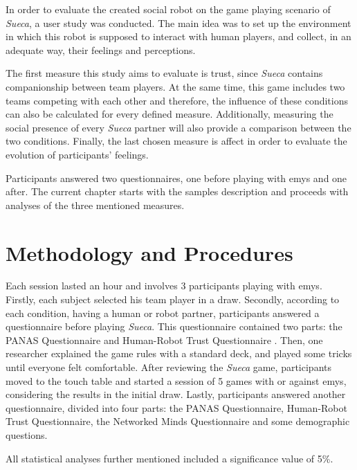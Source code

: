 \label{chapter:results}

In order to evaluate the created social robot on the game playing scenario of \emph{Sueca}, a user study was conducted.
The main idea was to set up the environment in which this robot is supposed to interact with human players, and collect, in an adequate way, their feelings and perceptions.

The first measure this study aims to evaluate is trust, since \emph{Sueca} contains companionship between team players.
At the same time, this game includes two teams competing with each other and therefore, the influence of these conditions can also be calculated for every defined measure.
Additionally, measuring the social presence of every \emph{Sueca} partner will also provide a comparison between the two conditions.
Finally, the last chosen measure is affect in order to evaluate the evolution of participants' feelings.

Participants answered two questionnaires, one before playing with \ac{emys} and one after.
The current chapter starts with the samples description and proceeds with analyses of the three mentioned measures.

\section{Methodology and Procedures}
Each session lasted an hour and involves 3 participants playing with \ac{emys}.
Firstly, each subject selected his team player in a draw.
Secondly, according to each condition, having a human or robot partner, participants answered a questionnaire before playing \emph{Sueca}.
This questionnaire contained two parts: the PANAS Questionnaire \cite{Egloff1998} and Human-Robot Trust Questionnaire \cite{Schaefer2013}.
Then, one researcher explained the game rules with a standard deck, and played some tricks until everyone felt comfortable.
After reviewing the \emph{Sueca} game, participants moved to the touch table and started a session of 5 games with or against \ac{emys}, considering the results in the initial draw.
Lastly, participants answered another questionnaire, divided into four parts: the PANAS Questionnaire, Human-Robot Trust Questionnaire, the Networked Minds Questionnaire \cite{Harms2004} and some demographic questions.

All statistical analyses further mentioned included a significance value of 5\%.

